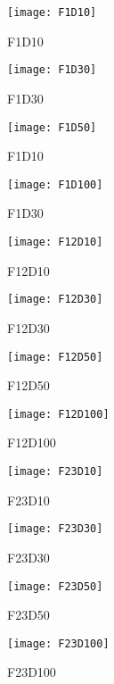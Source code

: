 \begin{figure*}[h!]
    \centering
    \begin{subfigure}[b]{0.24\textwidth}
        \texttt{[image: F1D10]}
        \caption{F1D10}
    \end{subfigure}
    \begin{subfigure}[b]{0.24\textwidth}
        \texttt{[image: F1D30]}
        \caption{F1D30}
    \end{subfigure}    
    \begin{subfigure}[b]{0.24\textwidth}
        \texttt{[image: F1D50]}
        \caption{F1D10}
    \end{subfigure}
    \begin{subfigure}[b]{0.24\textwidth}
        \texttt{[image: F1D100]}
        \caption{F1D30}
    \end{subfigure}

    \begin{subfigure}[b]{0.24\textwidth}
        \texttt{[image: F12D10]}
        \caption{F12D10}
    \end{subfigure}
    \begin{subfigure}[b]{0.24\textwidth}
        \texttt{[image: F12D30]}
        \caption{F12D30}
    \end{subfigure}        
    \begin{subfigure}[b]{0.24\textwidth}
        \texttt{[image: F12D50]}
        \caption{F12D50}
    \end{subfigure}
    \begin{subfigure}[b]{0.24\textwidth}
        \texttt{[image: F12D100]}
        \caption{F12D100}
    \end{subfigure}

    \begin{subfigure}[b]{0.24\textwidth}
        \texttt{[image: F23D10]}
        \caption{F23D10}
    \end{subfigure}
    \begin{subfigure}[b]{0.24\textwidth}
        \texttt{[image: F23D30]}
        \caption{F23D30}
    \end{subfigure}    
    \begin{subfigure}[b]{0.24\textwidth}
        \texttt{[image: F23D50]}
        \caption{F23D50}
    \end{subfigure}
    \begin{subfigure}[b]{0.24\textwidth}
        \texttt{[image: F23D100]}
        \caption{F23D100}
    \end{subfigure}


\end{figure*}
